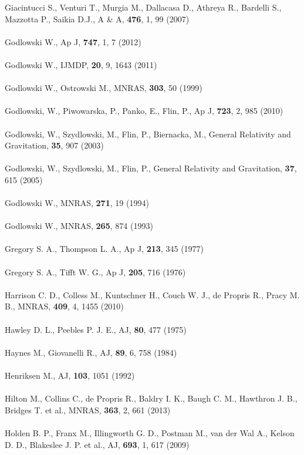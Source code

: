 Giacintucci S., Venturi T., Murgia M., Dallacasa D., Athreya R., Bardelli S., Mazzotta P., Saikia D.J., A \& A, \textbf{ 476},  1, 99 (2007)\\\\
Godlowski W., Ap J, \textbf{747}, 1, 7 (2012)\\\\
Godlowski W., IJMDP, \textbf{20}, 9, 1643 (2011)\\\\
Godlowski W., Ostrowski M., MNRAS, \textbf{303}, 50 (1999)\\\\
Godlowski, W., Piwowarska, P., Panko, E., Flin, P., Ap J, \textbf{723}, 2, 985 (2010)\\\\
Godlowski, W., Szydlowski, M., Flin, P., Biernacka, M., General Relativity and Gravitation, \textbf{35}, 907 (2003)\\\\
Godlowski, W., Szydlowski, M., Flin, P., General Relativity and Gravitation, \textbf{37}, 615 (2005)\\\\
Godlowski W., MNRAS, \textbf{271}, 19 (1994)\\\\
Godlowski W., MNRAS, \textbf{265}, 874 (1993)\\\\
Gregory S. A., Thompson L. A., Ap J, \textbf{213}, 345 (1977)\\\\
Gregory S. A., Tifft W. G., Ap J, \textbf{205}, 716 (1976)\\\\
Harrison C. D., Colless M., Kuntschner H., Couch W. J., de Propris R., Pracy M. B., MNRAS, \textbf{409},  4, 1455 (2010)\\\\
Hawley D. L., Peebles P. J. E., AJ, \textbf{80}, 477 (1975)\\\\
Haynes M., Giovanelli R., AJ, \textbf{89}, 6, 758 (1984)\\\\
Henriksen M., AJ, \textbf{103}, 1051 (1992)\\\\
Hilton M., Collins C., de Propris R., Baldry I. K., Baugh C. M., Hawthron J. B., Bridges T. et al., MNRAS, \textbf{363},  2, 661 (2013)\\\\
Holden B. P., Franx M., Illingworth G. D., Postman M., van der Wal A., Kelson D. D., Blakeslee J. P. et al.,  AJ, \textbf{693},  1, 617 (2009)\\\\
